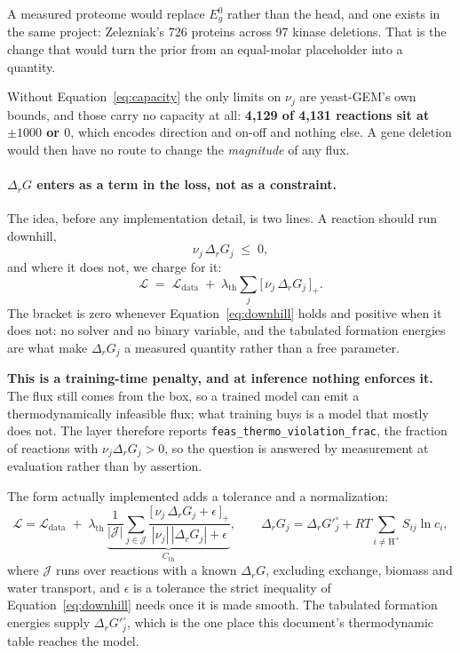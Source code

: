 A measured proteome would replace $E^0_g$ rather than the head, and one exists in the same
project: Zelezniak's 726 proteins across 97 kinase deletions. That is the change that would
turn the prior from an equal-molar placeholder into a quantity.

Without Equation~\eqref{eq:capacity} the only limits on $\nu_j$ are yeast-GEM's own bounds,
and those carry no capacity at all: \textbf{4{,}129 of 4{,}131 reactions sit at $\pm1000$ or
$0$}, which encodes direction and on-off and nothing else. A gene deletion would then have
no route to change the \emph{magnitude} of any flux. 

\paragraph{$\Delta_r G$ enters as a term in the loss, not as a constraint.} The idea, before
any implementation detail, is two lines. A reaction should run downhill,
\begin{equation}
  \nu_j\,\Delta_r G_j \;\le\; 0,
  \label{eq:downhill}
\end{equation}
and where it does not, we charge for it:
\begin{equation}
  \mathcal{L} \;=\; \mathcal{L}_{\mathrm{data}}
  \;+\; \lambda_{\mathrm{th}} \sum_j \big[\,\nu_j\,\Delta_r G_j\,\big]_{+}.
  \label{eq:simple}
\end{equation}
The bracket is zero whenever Equation~\eqref{eq:downhill} holds and positive when it does
not: no solver and no binary variable, and the tabulated formation energies are what make
$\Delta_r G_j$ a measured quantity rather than a free parameter.

\textbf{This is a training-time penalty, and at inference nothing enforces it.} The flux
still comes from the box, so a trained model can emit a thermodynamically infeasible flux;
what training buys is a model that mostly does not. The layer therefore reports
\texttt{feas\_thermo\_violation\_frac}, the fraction of reactions with $\nu_j\Delta_r G_j >
0$, so the question is answered by measurement at evaluation rather than by assertion. 

\medskip
\noindent The form actually implemented adds a tolerance and a normalization:
\begin{equation}
  \mathcal{L}
  = \mathcal{L}_{\mathrm{data}}
  \;+\; \lambda_{\mathrm{th}}\,
  \underbrace{\frac{1}{|\mathcal{J}|}\sum_{j\in\mathcal{J}}
    \frac{\big[\,\nu_j\,\Delta_r G_j + \epsilon\,\big]_{+}}
         {|\nu_j|\,|\Delta_r G_j| + \epsilon}}_{C_{\mathrm{th}}},
  \qquad
  \Delta_r G_j = \Delta_r G'^{\circ}_j + RT\!\!\sum_{i \neq \mathrm{H}^+}\!\! S_{ij}\ln c_i,
  \label{eq:secondlaw}
\end{equation}
where $\mathcal{J}$ runs over reactions with a known $\Delta_r G$, excluding exchange,
biomass and water transport, and $\epsilon$ is a tolerance the strict inequality of
Equation~\eqref{eq:downhill} needs once it is made smooth. The tabulated formation
energies supply $\Delta_r G'^{\circ}_j$, which is the one place this document's thermodynamic
table reaches the model.

